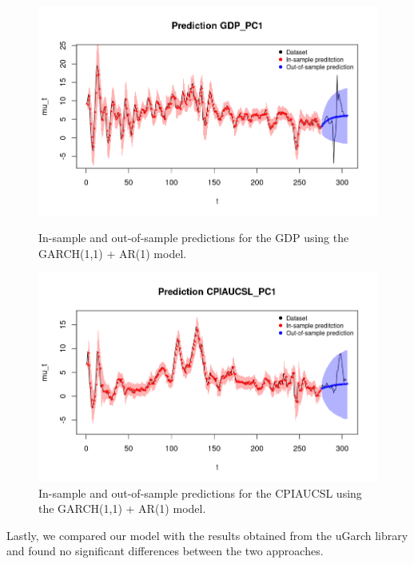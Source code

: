 \begin{figure}[H]
    \centering
    \begin{minipage}{0.49\textwidth}
        \centering
        \includegraphics[width=\textwidth]{images/5-GARCH/gdp_prediction.png}
        \caption{In-sample and out-of-sample predictions for the GDP using the GARCH(1,1) + AR(1) model.}
        \label{fig:GARCH1,1_AR1_gdp_prediction} 
    \end{minipage}\hfill
    \begin{minipage}{0.49\textwidth}
        \centering
        \includegraphics[width=\textwidth]{images/5-GARCH/infl_prediction.png}
        \caption{In-sample and out-of-sample predictions for the CPIAUCSL using the GARCH(1,1) + AR(1) model.}
        \label{fig:GARCH1,1_AR1_infl_prediction}
    \end{minipage}
\end{figure}
Lastly, we compared our model with the results obtained from the uGarch library and found no significant differences between the two approaches.